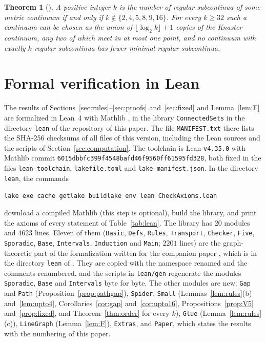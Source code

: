 \documentclass[11pt]{amsart}
\newtheorem{theorem}{Theorem}[section]
\theoremstyle{definition}
\theoremstyle{remark}
\begin{document}
\begin{theorem}[{\cite[Theorem~A]{AA2}}]\label{thm:topology}
A positive integer $k$ is the number of regular subcontinua of some metric continuum if and only if $k\notin\{2,4,5,8,9,16\}$. For every $k\ge32$ such a continuum can be chosen as the union of $\lfloor\log_2k\rfloor+1$ copies of the Knaster continuum, any two of which meet in at most one point, and no continuum with exactly $k$ regular subcontinua has fewer minimal regular subcontinua.
\end{theorem}

\section{Formal verification in Lean}\label{sec:lean}

The results of Sections~\ref{sec:rules}--\ref{sec:proofs} and~\ref{sec:fixed} and Lemma~\ref{lem:F} are formalized in Lean~4 \cite{Lean} with Mathlib \cite{Mathlib}, in the library \texttt{ConnectedSets} in the directory \texttt{lean} of the repository \cite{GRep} of this paper. The file \texttt{MANIFEST.txt} there lists the SHA-256 checksums of all files of this version, including the Lean sources and the scripts of Section~\ref{sec:computation}. The toolchain is Lean \texttt{v4.35.0} with Mathlib commit \texttt{6015dbbfc399f4548bafd46f9560ff61595fd328}, both fixed in the files \texttt{lean-toolchain}, \texttt{lakefile.toml} and \texttt{lake-manifest.json}. In the directory \texttt{lean}, the commands
\begin{center}
\texttt{lake exe cache get}\qquad\texttt{lake build}\qquad\texttt{lake env lean CheckAxioms.lean}
\end{center}
download a compiled Mathlib (this step is optional), build the library, and print the axioms of every statement of Table~\ref{tab:lean}. The library has $20$ modules and $4623$ lines. Eleven of them (\texttt{Basic}, \texttt{Defs}, \texttt{Rules}, \texttt{Transport}, \texttt{Checker}, \texttt{Five}, \texttt{Sporadic}, \texttt{Base}, \texttt{Intervals}, \texttt{Induction} and \texttt{Main}; $2201$ lines) are the graph-theoretic part of the formalization written for the companion paper \cite{AA2}, which is in the directory \texttt{lean} of \cite{Rep}. They are copied with the namespace renamed and the comments renumbered, and the scripts in \texttt{lean/gen} regenerate the modules \texttt{Sporadic}, \texttt{Base} and \texttt{Intervals} byte for byte. The other modules are new: \texttt{Gap} and \texttt{Path} (Proposition~\ref{prop:pathgap}), \texttt{Spider}, \texttt{Small} (Lemmas~\ref{lem:rules}(b) and~\ref{lem:upto4}, Corollaries~\ref{cor:gap} and~\ref{cor:upto16}, Propositions~\ref{prop:V5} and~\ref{prop:fixed}, and Theorem~\ref{thm:order} for every $k$), \texttt{Glue} (Lemma~\ref{lem:rules}(c)), \texttt{LineGraph} (Lemma~\ref{lem:F}), \texttt{Extras}, and \texttt{Paper}, which states the results with the numbering of this paper.
\end{document}
